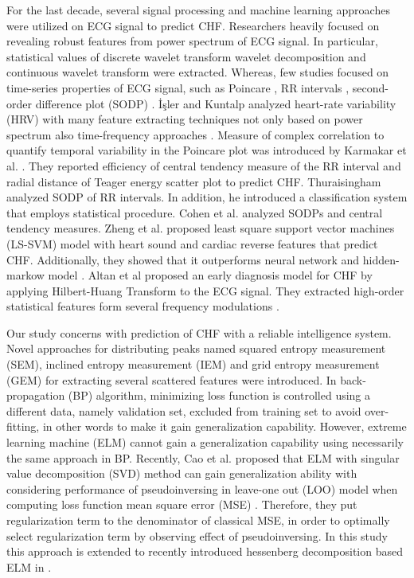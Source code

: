 \documentclass[twocolumn]{svjour3}
\begin{document}
For the last decade, several signal processing and machine learning approaches were utilized on ECG signal to predict CHF. Researchers heavily focused on revealing robust features from power spectrum of ECG signal. In particular, statistical values of  discrete wavelet transform \cite{ref3, ref4} wavelet decomposition \cite{ref5} and continuous wavelet transform \cite{ref6} were extracted. Whereas, few studies focused on time-series properties of ECG signal, such as Poincare \cite{ref7, ref8}, RR intervals \cite{ref9,ref10}, second-order difference plot (SODP) \cite{ref11, ref12}. \.{I}\c{s}ler and Kuntalp analyzed heart-rate variability (HRV) with many feature extracting techniques not only based on power spectrum also time-frequency approaches \cite{ref13}. Measure of complex correlation to quantify temporal variability in the Poincare plot was introduced by Karmakar et al. \cite{ref14}. They reported efficiency of central tendency measure of the RR interval and radial distance of Teager energy scatter plot to predict CHF. Thuraisingham \cite{ref15} analyzed SODP of RR intervals. In addition, he introduced a classification system that employs statistical procedure. Cohen et al.\cite{ref12} analyzed SODPs and central tendency measures. Zheng et al. proposed least square support vector machines (LS-SVM) model with heart sound and cardiac reverse features that predict CHF. Additionally, they showed that it outperforms neural network and hidden-markow model \cite{ref16}. Altan et al proposed an early diagnosis model for CHF by applying Hilbert-Huang Transform to the ECG signal. They extracted high-order statistical features form several frequency modulations \cite{ref17}.

Our study concerns with prediction of CHF with a reliable intelligence system. Novel approaches for distributing peaks named squared entropy measurement (SEM), inclined entropy measurement (IEM) and grid entropy measurement (GEM) for extracting several scattered features were introduced. In back-propagation (BP) algorithm, minimizing loss function is controlled using a different data, namely validation set, excluded from training set to avoid over-fitting, in other words to make it gain generalization capability. However, extreme learning machine (ELM) cannot gain a generalization capability using necessarily the same approach in BP. Recently, Cao et al.  proposed that ELM with singular value decomposition (SVD) method can gain generalization ability with considering performance of pseudoinversing in leave-one out (LOO) model when computing loss function mean square error (MSE) \cite{ref18}. Therefore, they put regularization term to the denominator of classical MSE, in order to optimally select regularization term by observing effect of pseudoinversing. In this study this approach is extended to recently introduced hessenberg decomposition based ELM in \cite{ref18}.
\end{document}
